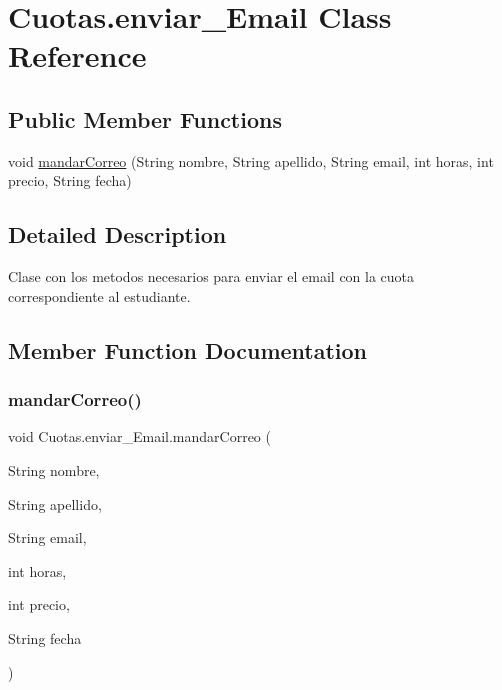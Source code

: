 \hypertarget{class_cuotas_1_1enviar___email}{}\section{Cuotas.\+enviar\+\_\+\+Email Class Reference}
\label{class_cuotas_1_1enviar___email}
\subsection*{Public Member Functions}
\begin{DoxyCompactItemize}
\item 
void \hyperlink{class_cuotas_1_1enviar___email_ab9302f3ef5af349fb36bbfe20a700447}{mandar\+Correo} (String nombre, String apellido, String email, int horas, int precio, String fecha)
\end{DoxyCompactItemize}


\subsection{Detailed Description}
Clase con los metodos necesarios para enviar el email con la cuota correspondiente al estudiante. 

\subsection{Member Function Documentation}
\mbox{\label{class_cuotas_1_1enviar___email_ab9302f3ef5af349fb36bbfe20a700447}} 
\subsubsection{\texorpdfstring{mandar\+Correo()}{mandarCorreo()}}
{\footnotesize\ttfamily void Cuotas.\+enviar\+\_\+\+Email.\+mandar\+Correo (\begin{DoxyParamCaption}\item[{String}]{nombre,  }\item[{String}]{apellido,  }\item[{String}]{email,  }\item[{int}]{horas,  }\item[{int}]{precio,  }\item[{String}]{fecha }\end{DoxyParamCaption})}

